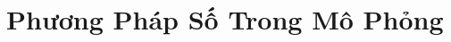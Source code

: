   
\chapter{Phương Pháp Số Trong Mô Phỏng}








\begin{refsection}
\nocite{golub2013matrix,langtangen2017finite,zienkiewicz2005finite,LoggEtal_10_2012}
\printbibliography
\end{refsection}